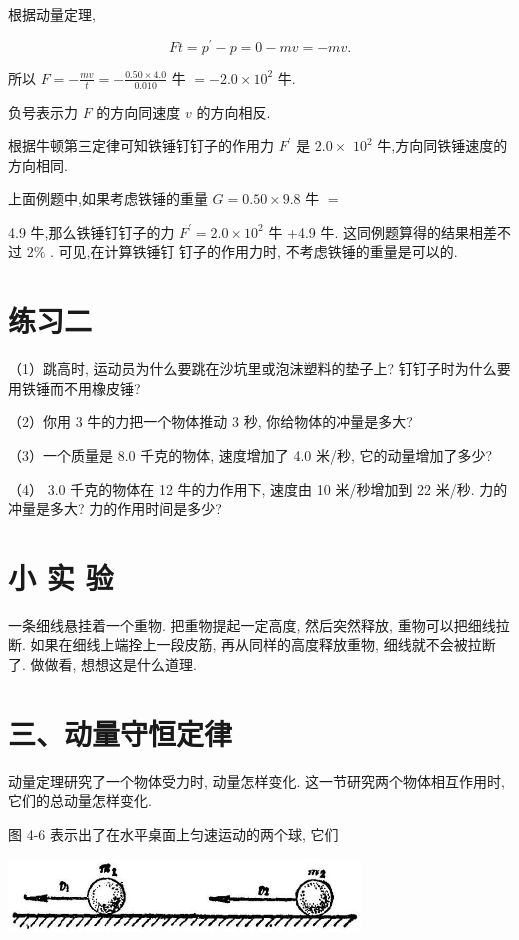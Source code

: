 \documentclass[10pt]{article}
\begin{document}
根据动量定理,

\[
{Ft} = {p}^{\prime } - p = 0 - {mv} = - {mv}.
\]

所以 \(F = - \frac{mv}{t} = - \frac{{0.50} \times {4.0}}{0.010}\) 牛 \(= - {2.0} \times {10}^{2}\) 牛.

负号表示力 \(F\) 的方向同速度 \(v\) 的方向相反.

根据牛顿第三定律可知铁锤钉钉子的作用力 \({F}^{\prime }\) 是 \({2.0} \times\) \({10}^{2}\) 牛,方向同铁锤速度的方向相同.

上面例题中,如果考虑铁锤的重量 \(G = {0.50} \times {9.8}\) 牛 \(=\)

4.9 牛,那么铁锤钉钉子的力 \({F}^{\prime } = {2.0} \times {10}^{2}\) 牛 +4.9 牛. 这同例题算得的结果相差不过 \(2\%\) . 可见,在计算铁锤钉 钉子的作用力时, 不考虑铁锤的重量是可以的.

\section*{练习二}

（1）跳高时, 运动员为什么要跳在沙坑里或泡沫塑料的垫子上? 钉钉子时为什么要用铁锤而不用橡皮锤?

（2）你用 3 牛的力把一个物体推动 3 秒, 你给物体的冲量是多大?

（3）一个质量是 8.0 千克的物体, 速度增加了 4.0 米/秒, 它的动量增加了多少?

（4） 3.0 千克的物体在 12 牛的力作用下, 速度由 10 米/秒增加到 22 米/秒. 力的冲量是多大? 力的作用时间是多少?

\section*{小 实 验}

一条细线悬挂着一个重物. 把重物提起一定高度, 然后突然释放, 重物可以把细线拉断. 如果在细线上端拴上一段皮筋, 再从同样的高度释放重物, 细线就不会被拉断了. 做做看, 想想这是什么道理.

\section*{三、动量守恒定律}

动量定理研究了一个物体受力时, 动量怎样变化. 这一节研究两个物体相互作用时, 它们的总动量怎样变化.

图 4-6 表示出了在水平桌面上匀速运动的两个球, 它们

\begin{center}
\includegraphics[max width=0.7\textwidth]{images/01912d55-147c-70aa-b0e0-1782a122f948_119_337576.jpg}
\end{center}
\end{document}
